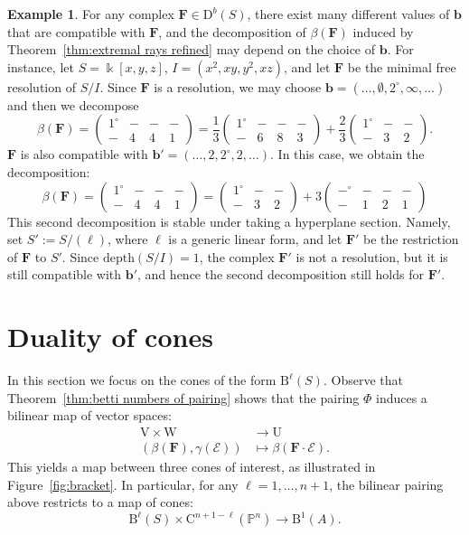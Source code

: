\documentclass[12pt]{amsart}
\theoremstyle{definition}
\newtheorem{example}[lemma]{Example}
\theoremstyle{remark}
\newcommand{\kk}{\Bbbk}
\newcommand{\PP}{\mathbb{P}}
\newcommand{\UU}{\mathrm{U}}
\newcommand{\VV}{\mathrm{V}}
\newcommand{\WW}{\mathrm{W}}
\newcommand{\bb}{\mathbf{b}}
\newcommand{\cE}{\mathcal{E}}
\newcommand{\FF}{\mathbf{F}}
\newcommand{\zp}{\circ}
\newcommand{\DD}{\mathrm{D}}
\newcommand{\CQ}{\mathrm{C}}
\newcommand{\BBQ}{\mathrm{B}}
\begin{document}
\begin{example}
For any complex $\FF\in \DD^b(S)$, there exist many different values of $\bb$ that are compatible with $\FF$, and the decomposition of $\beta(\FF)$ induced by Theorem~\ref{thm:extremal rays refined} may depend on the choice of $\bb$.   For instance, let $S=\kk[x,y,z]$, $I=(x^2,xy,y^2,xz)$, and let $\FF$ be the minimal free resolution of $S/I$.  Since $\FF$ is a resolution, we may choose $\bb=(\dots, \emptyset, 2^\zp, \infty, \dots)$ and then we decompose
\[
\beta(\FF)=\begin{pmatrix}
1^\zp&-&-&-\\
-&4&4&1
\end{pmatrix}
=
\frac{1}{3}
\begin{pmatrix}
1^\zp&-&-&-\\
-&6&8&3
\end{pmatrix}
+\frac{2}{3}
\begin{pmatrix}
1^\zp&-&-\\
-&3&2
\end{pmatrix}.
\]
$\FF$ is also compatible with $\bb'=(\dots, 2, 2^\zp, 2, \dots)$.  In this case, we obtain the decomposition:
\[
\beta(\FF)=
\begin{pmatrix}
1^\zp&-&-&-\\
-&4&4&1
\end{pmatrix}
=\begin{pmatrix}1^\zp&-&-\\-&3&2\end{pmatrix}
+
3\begin{pmatrix}
-^\zp&-&-&-\\
-&1&2&1
\end{pmatrix}
\] 
This second decomposition is stable under taking a hyperplane section.  Namely, set $S':=S/(\ell)$, where $\ell$ is a generic linear form, and let $\FF'$ be the restriction of $\FF$ to $S'$.  Since $\text{depth}(S/I)=1$, the complex $\FF'$ is not a resolution, but it is still compatible with $\bb'$, and hence the second decomposition still holds for $\FF'$.
\end{example}




\section{Duality of cones}\label{sec:duality}
In this section we focus on the cones of the form $\BBQ^\ell(S)$.  Observe that Theorem~\ref{thm:betti numbers of pairing} shows that the pairing $\Phi$ induces a bilinear map of vector spaces:
\begin{align*}
\VV\times \WW & \to \UU\\
(\beta(\FF),\gamma(\cE))&\mapsto \beta(\FF\cdot \cE).
\end{align*}
This yields a map between three cones of interest, as illustrated in Figure~\ref{fig:bracket}.  In particular, for any $\ell=1, \dots, n+1$, the bilinear pairing above restricts to a map of cones:
\[
\BBQ^{\ell}(S)\times \CQ^{n+1-\ell}(\PP^n)\to \BBQ^1(A).
\]
\end{document}

